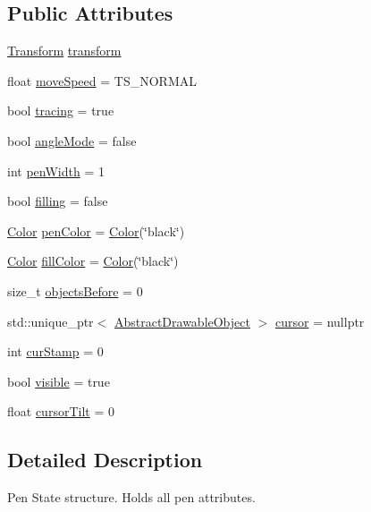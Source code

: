 \subsection*{Public Attributes}
\begin{DoxyCompactItemize}
\item 
\hyperlink{classcturtle_1_1Transform}{Transform} \hyperlink{structcturtle_1_1PenState_ac6b3e58155d09bf78a315c616874fa89}{transform}
\item 
float \hyperlink{structcturtle_1_1PenState_af5432bc75dcc374e6269a28a656a6c49}{move\+Speed} = T\+S\+\_\+\+N\+O\+R\+M\+AL
\item 
bool \hyperlink{structcturtle_1_1PenState_aa6992297fb8f109e20599c31dd29cd6f}{tracing} = true
\item 
bool \hyperlink{structcturtle_1_1PenState_ae860bb135dc50937453694b8331a014d}{angle\+Mode} = false
\item 
int \hyperlink{structcturtle_1_1PenState_a5ca3f05c53ca672de4466e4c7f5f3328}{pen\+Width} = 1
\item 
bool \hyperlink{structcturtle_1_1PenState_aa74bc9fbcc2f4eba76d8b8856ba30eff}{filling} = false
\item 
\hyperlink{classcturtle_1_1Color}{Color} \hyperlink{structcturtle_1_1PenState_a2fb76e7573bfa387e1858df701dab60b}{pen\+Color} = \hyperlink{classcturtle_1_1Color}{Color}(\char`\"{}black\char`\"{})
\item 
\hyperlink{classcturtle_1_1Color}{Color} \hyperlink{structcturtle_1_1PenState_a787b9819a36fe8b87d7ce60574df19df}{fill\+Color} = \hyperlink{classcturtle_1_1Color}{Color}(\char`\"{}black\char`\"{})
\item 
size\+\_\+t \hyperlink{structcturtle_1_1PenState_a7309ce91cbc711775e59a9ce1ed150a5}{objects\+Before} = 0
\item 
std\+::unique\+\_\+ptr$<$ \hyperlink{classcturtle_1_1AbstractDrawableObject}{Abstract\+Drawable\+Object} $>$ \hyperlink{structcturtle_1_1PenState_af57060055c671d34395271a50553b922}{cursor} = nullptr
\item 
int \hyperlink{structcturtle_1_1PenState_a5a5c623893c76f00325223e075af714b}{cur\+Stamp} = 0
\item 
bool \hyperlink{structcturtle_1_1PenState_a7c1380e85858e04607427fcddeb1cba7}{visible} = true
\item 
float \hyperlink{structcturtle_1_1PenState_a6ebb8d220523e19a27922ff5d04931de}{cursor\+Tilt} = 0
\end{DoxyCompactItemize}


\subsection{Detailed Description}
Pen State structure. Holds all pen attributes. 

